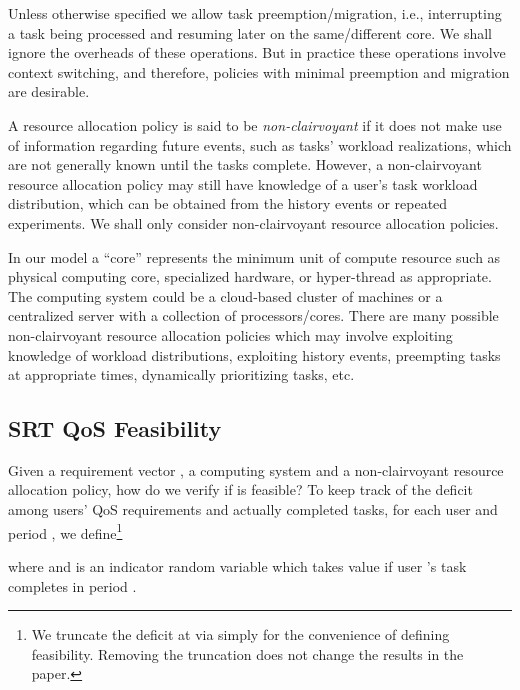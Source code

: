 \documentclass[prodmode,acmtompecs]{acmsmall}
\newcommand{\myComments}[1]{}
\newif\ifinfocom
\newif\iftompecs
\newcommand{\infocomStart}{\ifinfocom \myComments{Infocom: }}
\newcommand{\tompecsStart}{\iftompecs \myComments{TOMPECS version: }}
\newcommand{\commentEnd}{\myComments{End}}
\begin{document}
Unless otherwise specified we allow task preemption/migration, i.e., interrupting a task being processed and resuming later on the same/different core. We shall ignore the overheads of these operations. But in practice these operations involve context switching, and therefore, policies with minimal preemption and migration are desirable. 

A resource allocation policy is said to be {\em non-clairvoyant} if it does not make use of information regarding future events, such as tasks' workload realizations, which are not generally known until the tasks complete. However, a non-clairvoyant resource allocation policy may still have knowledge of a user's task workload distribution, which can be obtained from the history events or repeated experiments. We shall only consider non-clairvoyant resource allocation policies. 

In our model a ``core'' represents the minimum unit of compute resource such as physical computing core, specialized hardware, or hyper-thread as appropriate. The computing system could be a cloud-based cluster of machines or a centralized server with a collection of processors/cores. There are many possible non-clairvoyant resource allocation policies which may involve exploiting knowledge of workload distributions, exploiting history events, preempting tasks at appropriate times, dynamically prioritizing tasks, etc. 

\subsection{SRT QoS Feasibility}
Given a requirement vector , a computing system and a non-clairvoyant resource allocation policy, how do we verify if  is feasible?  
To keep track of the deficit among users' QoS requirements and actually completed tasks, for each user  and period , we define\footnote{We truncate the deficit at  via  simply for the convenience of defining feasibility. Removing the truncation does not change the results in the paper. }

where  and  is an indicator random variable which takes value  if user 's task completes in period . 
\infocomStart
The deficit vector  is a summary of the history of events up to period . 
\commentEnd\fi
\tompecsStart
We let  denote the deficit vector.  is a summary of the history of events up to period . 
\commentEnd\fi
\end{document}
